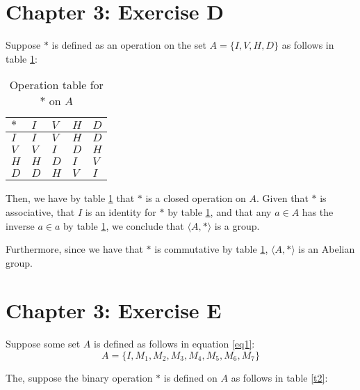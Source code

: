 \documentclass[12pt]{article}
\begin{document}
\section{Chapter 3: Exercise D}

Suppose $*$ is defined as an operation on the set $A = \{ I, V, H, D\}$ as follows in table \ref{t1}:

\begin{table}[!ht] 
\begin{tabular}{l|llll}
$*$ & $I$ & $V$ & $H$ & $D$ \\ \hline
$I$ & $I$ & $V$ & $H$ & $D$ \\
$V$ & $V$ & $I$ & $D$ & $H$ \\
$H$ & $H$ & $D$ & $I$ & $V$ \\
$D$ & $D$ & $H$ & $V$ & $I$ \\
\end{tabular}
\centering
\caption{Operation table for $*$ on $A$}
\label{t1}
\end{table}


Then, we have by table \ref{t1} that $*$ is a closed operation on $A$. Given that $*$ is associative, that $I$ is an identity for $*$ by table \ref{t1}, and that any $a \in A$ has the inverse $a \in a$ by table \ref{t1}, we conclude that $\langle A, * \rangle$ is a group.

Furthermore, since we have that $*$ is commutative by table \ref{t1}, $\langle A, * \rangle$ is an Abelian group.


\section{Chapter 3: Exercise E}

Suppose some set $A$ is defined as follows in equation \ref{eq1}:
\begin{equation}
\label{eq1}
	A = \{ I, M_1, M_2, M_3, M_4, M_5, M_6, M_7 \}
\end{equation}

The, suppose the binary operation $*$ is defined on $A$ as follows in table \ref{t2}:
\end{document}
